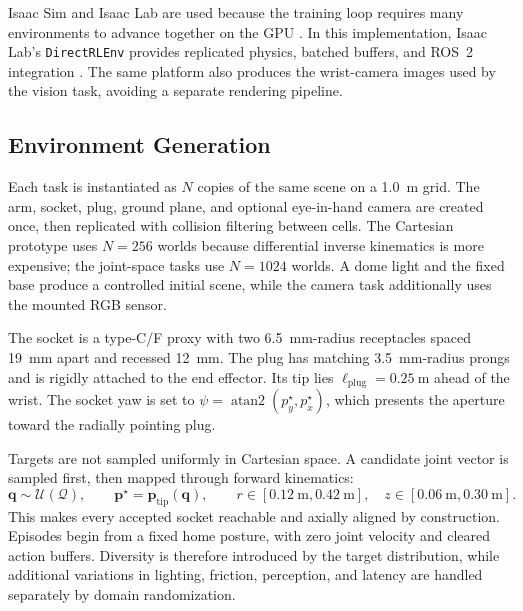Isaac Sim and Isaac Lab are used because the training loop requires many environments to advance together on the GPU \cite{makoviychuk_2021_isaacgym}. In this implementation, Isaac Lab's \texttt{DirectRLEnv} provides replicated physics, batched buffers, and ROS~2 integration \cite{mittal_2023_orbit,rudin_2022_parallel}. The same platform also produces the wrist-camera images used by the vision task, avoiding a separate rendering pipeline.

\rlFloatBarrier

\subsection{Environment Generation}\label{rl:sec:rl-envgen}

Each task is instantiated as $N$ copies of the same scene on a \SI{1.0}{\meter} grid. The arm, socket, plug, ground plane, and optional eye-in-hand camera are created once, then replicated with collision filtering between cells. The Cartesian prototype uses $N=256$ worlds because differential inverse kinematics is more expensive; the joint-space tasks use $N=1024$ worlds. A dome light and the fixed base produce a controlled initial scene, while the camera task additionally uses the mounted RGB sensor.

The socket is a type-C/F proxy with two \SI{6.5}{\milli\meter}-radius receptacles spaced \SI{19}{\milli\meter} apart and recessed \SI{12}{\milli\meter}. The plug has matching \SI{3.5}{\milli\meter}-radius prongs and is rigidly attached to the end effector. Its tip lies $\ell_{\mathrm{plug}}=\SI{0.25}{\meter}$ ahead of the wrist. The socket yaw is set to $\psi=\operatorname{atan2}(p_y^{\star},p_x^{\star})$, which presents the aperture toward the radially pointing plug.

Targets are not sampled uniformly in Cartesian space. A candidate joint vector is sampled first, then mapped through forward kinematics:
\begin{equation*}
\bm{q}\sim\mathcal{U}(\mathcal{Q}),\qquad
\bm{p}^{\star}=\bm{p}_{\mathrm{tip}}(\bm{q}),\qquad
r\in[\SI{0.12}{\meter},\SI{0.42}{\meter}],\quad z\in[\SI{0.06}{\meter},\SI{0.30}{\meter}].
\end{equation*}
This makes every accepted socket reachable and axially aligned by construction. Episodes begin from a fixed home posture, with zero joint velocity and cleared action buffers. Diversity is therefore introduced by the target distribution, while additional variations in lighting, friction, perception, and latency are handled separately by domain randomization.

